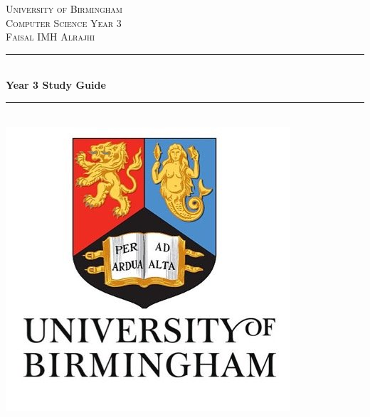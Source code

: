 \documentclass[12pt, a4paper, oneside, titlepage]{report}
\begin{document}
		\begin{titlepage}
		\newcommand{\HRule}{\rule{\linewidth}{0.5mm}} %
		
		\center %
		
		
		\textsc{\LARGE University of Birmingham}\\[1.5cm] %
		\textsc{\Large Computer Science Year 3}\\[0.5cm] %
		\textsc{\Large Faisal IMH Alrajhi}\\[0.5cm]
		
		
		\HRule \\[0.4cm]
		{ \huge \bfseries Year 3 Study Guide}\\[0.4cm] %
		\HRule \\[1.5cm]
		
		
		\includegraphics[scale=0.75]{logo.png}\\[1cm] %
		
		
		\vfill %
		
	\end{titlepage}
\end{document}
